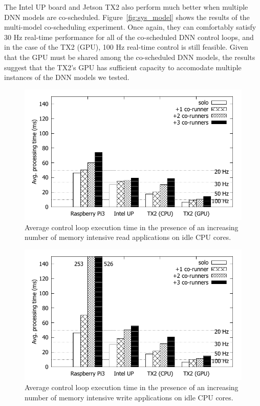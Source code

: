 The Intel UP board and Jetson TX2 also perform much better when multiple DNN models
are co-scheduled. Figure~\ref{fig:sys_model} shows the results of the
multi-model co-scheduling experiment. Once again, they can comfortably
satisfy 30 Hz real-time performance for all of the co-scheduled DNN control
loops, and in the case of the TX2 (GPU), 100 Hz real-time control is still
feasible. Given that the GPU must be shared among the co-scheduled DNN
models, the results suggest that the TX2's GPU has sufficient capacity to
accomodate multiple instances of the DNN models we tested.

\begin{figure}[h]
  \centering
  \includegraphics[width=.45\textwidth]{figs/compare_benchmark_read}
  \caption{Average control loop execution time in the presence of an
    increasing number of memory intensive read applications on idle CPU cores.}
  \label{fig:sys_bench_read}
\end{figure} 

\begin{figure}[h]
  \centering
  \includegraphics[width=.45\textwidth]{figs/compare_benchmark}
  \caption{Average control loop execution time in the presence of an
    increasing number of memory intensive write applications on idle CPU cores.}
  \label{fig:sys_bench}
\end{figure} 


